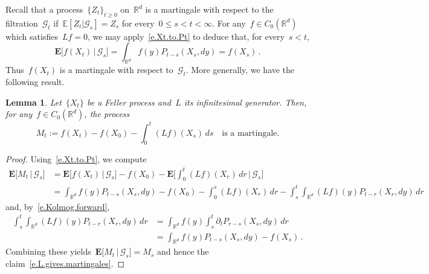 \documentclass[11pt,twoside]{article} %
\numberwithin{equation}{section}
\newtheorem{lemma}[theorem]{Lemma}
\theoremstyle{definition}
\newcommand*{\Rd}{\ensuremath{\mathbb{R}^d}}
\newcommand{\E}{\mathbb{E}}
\begin{document}
\smallskip

Recall that a process~$\{ Z_t \}_{t\geq 0}$ on~$\Rd$ is a martingale with respect to the filtration~$\mathcal{G}_t$ if~$\E[ Z_t \vert \mathcal{G}_s ] = Z_s$ for every~$0\leq s < t<\infty$. 
For any~$f \in C_0(\Rd)$ which satisfies~$L f = 0$, we may apply~\eqref{e.Xt.to.Pt} to deduce that, for every~$s<t$, 
\begin{equation}
\mathbf{E}\bigl[ f(X_t) \,|\, \mathcal{G}_s \bigr] 
=
\int_{\Rd} 
f(y) P_{t-s} (X_s,dy) 
=
f(X_s)\,.
\end{equation}
Thus~$f(X_t)$ is a martingale with respect to~$\mathcal{G}_t$. 
More generally, we have the following result.

\begin{lemma}
Let~$\{X_t\}$ be a Feller process and~$L$ its infinitesimal generator. Then, for any~$f\in C_0(\Rd)$, the process
\begin{equation}
\label{e.L.gives.martingales}
M_t := f(X_t) - f(X_0) - \int_0^t (Lf)(X_s)\,ds
\quad \mbox{is a martingale.}
\end{equation}
\end{lemma}
\begin{proof}
Using~\eqref{e.Xt.to.Pt}, we compute
\begin{align*}
\mathbf{E} \bigl[ M_t \, \vert\, \mathcal{G}_s \bigr] 
&
=
\mathbf{E}\bigl[ f(X_t) \,|\, \mathcal{G}_s \bigr] 
- f(X_0) 
-
\mathbf{E}\biggl[ 
\int_0^t
(Lf)(X_r)\,dr
\,\Big\vert\, \mathcal{G}_s
\biggr]
\\ & 
= 
\! \int_{\Rd} \!
f(y) P_{t-s} (X_s,dy) 
- f(X_0)
-
\! \int_0^s (Lf)(X_r)\,dr
-
\int_s^t \!
\int_{\Rd} 
(Lf)(y) P_{t-r}(X_r,dy)
\,dr
\end{align*}
and, by~\eqref{e.Kolmog.forward}, 
\begin{align*}
\int_s^t 
\int_{\Rd} 
(Lf)(y) P_{t-r}(X_r,dy)
\,dr
&
=
\int_{\Rd} 
f(y) 
\int_s^t 
\partial_t P_{r-s}(X_s,dy)
\,dr
\\ & 
=
\int_{\Rd} 
f(y) P_{t-s}(X_s,dy)
-
f(X_s)\,.
\end{align*}
Combining these yields~$\mathbf{E} \bigl[ M_t \, \vert\, \mathcal{G}_s \bigr] = M_s$ and hence the claim~\eqref{e.L.gives.martingales}. 
\end{proof}
\end{document}
